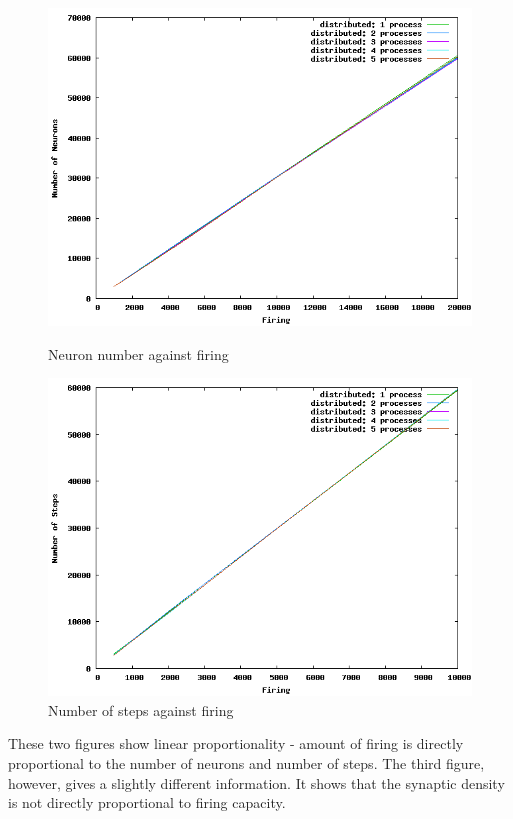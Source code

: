 \begin{figure}[ht]
\begin{minipage}[b]{0.5\linewidth}
\centering
\includegraphics[width=\textwidth]{images/neuron_firing.png}
\caption{Neuron number against firing}
\label{fig:figure1}
\end{minipage}
\begin{minipage}[b]{0.5\linewidth}
\centering
\includegraphics[width=\textwidth]{images/steps_firing.png}
\caption{Number of steps against firing}
\label{fig:figure3}
\end{minipage}
\end{figure}

These two figures show linear proportionality - amount of firing is directly proportional to the number of neurons and number of steps.
The third figure, however, gives a slightly different information. It shows that the synaptic density is not directly proportional to firing capacity.

